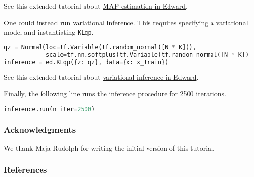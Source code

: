 See this extended tutorial about
\href{/tutorials/map}{MAP estimation in Edward}.

One could instead run variational inference. This requires specifying
a variational model and instantiating \texttt{KLqp}.
\begin{lstlisting}[language=Python]
qz = Normal(loc=tf.Variable(tf.random_normal([N * K])),
            scale=tf.nn.softplus(tf.Variable(tf.random_normal([N * K]))))
inference = ed.KLqp({z: qz}, data={x: x_train})
\end{lstlisting}
See this extended tutorial about
\href{/tutorials/variational-inference}{variational inference in Edward}.

Finally, the following line runs the inference procedure for 2500
iterations.
\begin{lstlisting}[language=Python]
inference.run(n_iter=2500)
\end{lstlisting}

\subsubsection{Acknowledgments}

We thank Maja Rudolph for writing the initial version of this
tutorial.

\subsubsection{References}
